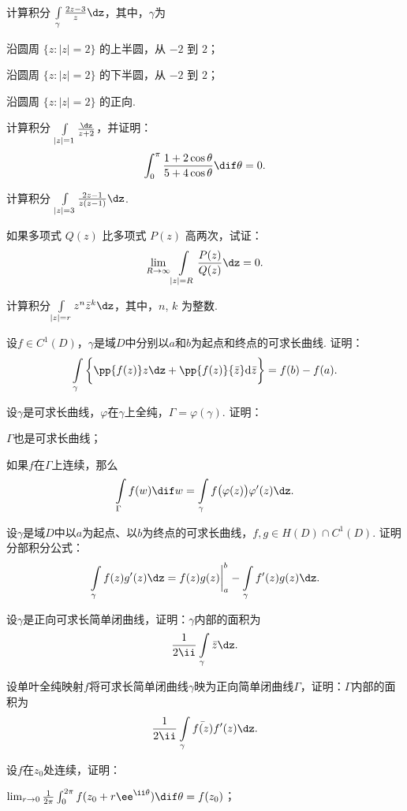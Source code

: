 \begin{xiti}
\item 计算积分 $\int\limits_\gamma\frac{2z-3}z\dz$，其中，$\gamma$为
  \begin{enuma}
    \item 沿圆周 $\{z:|z|=2\}$ 的上半圆，从 $-2$ 到 $2$；
    \item 沿圆周 $\{z:|z|=2\}$ 的下半圆，从 $-2$ 到 $2$；
    \item 沿圆周 $\{z:|z|=2\}$ 的正向.
  \end{enuma}
\item 计算积分 $\int\limits_{|z|=1}\frac{\dz}{z+2}$，并证明：
\[\int_0^\pi\frac{1+2\cos\theta}{5+4\cos\theta}\dif\theta=0.\]
\item 计算积分 $\int\limits_{|z|=3}\frac{2z-1}{z(z-1)}\dz$.
\item 如果多项式 $Q(z)$ 比多项式 $P(z)$ 高两次，试证：
  \[\lim_{R\to\infty}\int\limits_{|z|=R}\frac{P(z)}{Q(z)}\dz=0.\]
\item 计算积分$\int\limits_{|z|=r}z^n\bar z^k\dz$，其中，$n$, $k$ 为整数.
\item 设$f\in C^1(D)$，$\gamma$是域$D$中分别以$a$和$b$为起点和终点的可求长曲线. 证明：
  \[\int\limits_\gamma\bigg\{\pp{f(z)}z\dz+\pp{f(z)}{\bar z}\textrm d\bar z\bigg\}=f(b)-f(a).\]
\item 设$\gamma$是可求长曲线，$\varphi$在$\gamma$上全纯，$\Gamma=\varphi(\gamma)$. 证明：
  \begin{enuma}
    \item $\Gamma$也是可求长曲线；
    \item 如果$f$在$\Gamma$上连续，那么
    \[\int\limits_\Gamma f(w)\dif w=\int\limits_\gamma f\big(\varphi(z)\big)\varphi'(z)\dz.\]
  \end{enuma}
\item 设$\gamma$是域$D$中以$a$为起点、以$b$为终点的可求长曲线，$f,g\in H(D)\cap C^1(D)$. 证明分部积分公式：
    \[\int\limits_\gamma f(z)g'(z)\dz=f(z)g(z)\bigg|_a^b-\int\limits_\gamma f'(z)g(z)\dz.\]
\item 设$\gamma$是正向可求长简单闭曲线，证明：$\gamma$内部的面积为
  \[\frac1{2\ii}\int\limits_\gamma\bar z\dz.\]
\item 设单叶全纯映射$f$将可求长简单闭曲线$\gamma$映为正向简单闭曲线$\Gamma$，证明：$\Gamma$内部的面积为
  \[\frac1{2\ii}\int\limits_\gamma\bar{f(z)}f'(z)\dz.\]
\item 设$f$在$z_0$处连续，证明：
  \begin{enuma}
    \item $\lim_{r\to0}\frac1{2\pi}\int_0^{2\pi}f(z_0+r\ee^{\ii\theta})\dif\theta=f(z_0)$；

\end{enuma}
\end{xiti}
